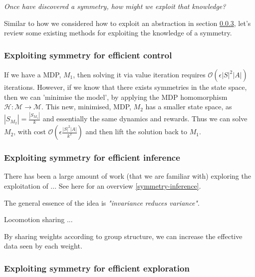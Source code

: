 \begin{displayquote}
\textsl{Once have discovered a symmetry, how might we exploit that knowledge?}
\end{displayquote}

Similar to how we considered how to exploit an abstraction in section \ref{},
let's review some existing methods for exploiting the knowledge of a symmetry. \footnotemark[22]



\subsubsection{Exploiting symmetry for efficient control}

If we have a MDP, $M_1$, then solving it via value iteration requires $\mathcal O(\epsilon |S|^2|A|)$ iterations.
However, if we know that there exists symmetries in the state space, then we can 'minimise the model',
by applying the MDP homomorphism $\mathcal H: \mathcal M\to \mathcal M$.
This new, minimised, MDP, $M_2$ has a smaller state space, as $|S_{M_2}| = \frac{|S_{M_1}|}{k}$
and essentially the same dynamics and rewards. Thus we can solve $M_2$, with cost $\mathcal O(\epsilon \frac{|S|^2|A|}{k^2})$
and then lift the solution back to $M_1$. \cite{Dean1997, NARAYANAMURTHY}


\subsubsection{Exploiting symmetry for efficient inference}

There has been a large amount of work (that we are familiar with) exploring
the exploitation of ... See  here for an overview \ref{symmetry-inference}.

The general essence of the idea is \textit{"invariance reduces variance"}. \cite{Chen2019}

Locomotion sharing ... \cite{Abdolhosseini}

By sharing weights according to group structure\cite{Ravanbakhsh2017a}, we can increase the effective data seen by each weight.

\subsubsection{Exploiting symmetry for efficient exploration}


